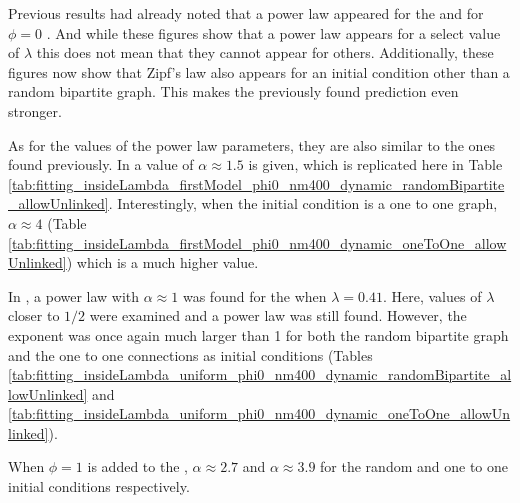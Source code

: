 Previous results had already noted that a power law appeared for the \firstm{} and \secondmodel{} for $\phi=0$ \cite{Ferrer2005a} \cite{Ferrer2003a}.
And while these figures show that a power law appears for a select value of $\lambda$ this does not mean that they cannot appear for others.
Additionally, these figures now show that Zipf's law also appears for an initial condition other than a random bipartite graph.
This makes the previously found prediction even stronger.

As for the values of the power law parameters, they are also similar to the ones found previously.
In \cite{Ferrer2005a} a value of $\alpha \approx 1.5$ is given, which is replicated here in Table \ref{tab:fitting_insideLambda_firstModel_phi0_nm400_dynamic_randomBipartite_allowUnlinked}.
Interestingly, when the initial condition is a one to one graph, $\alpha \approx 4$ (Table \ref{tab:fitting_insideLambda_firstModel_phi0_nm400_dynamic_oneToOne_allowUnlinked}) which is a much higher value.

In \cite{Ferrer2003a}, a power law with $\alpha \approx 1$ was found for the \secondmodel{} when $\lambda=0.41$.
Here, values of $\lambda$ closer to $1/2$ were examined and a power law was still found.
However, the exponent was once again much larger than 1 for both the random bipartite graph and the one to one connections as initial conditions (Tables \ref{tab:fitting_insideLambda_uniform_phi0_nm400_dynamic_randomBipartite_allowUnlinked} and \ref{tab:fitting_insideLambda_uniform_phi0_nm400_dynamic_oneToOne_allowUnlinked}).

When $\phi=1$ is added to the \secondmodel{}, $\alpha \approx 2.7$ and $\alpha \approx 3.9$ for the random and one to one initial conditions respectively.


